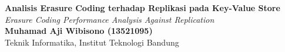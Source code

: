 \documentclass[a2,portrait]{config/poster/a0poster}
\begin{document}

\begin{minipage}[c]{\linewidth}
\Huge \textbf{Analisis Erasure Coding terhadap Replikasi pada Key-Value Store} \\
\large \textit{Erasure Coding Performance Analysis Against Replication} \\
\normalsize \textbf{Muhamad Aji Wibisono (13521095)} \\
\normalsize Teknik Informatika, Institut Teknologi Bandung \\
\end{minipage}

\vspace{0.05cm} %

\end{document}
